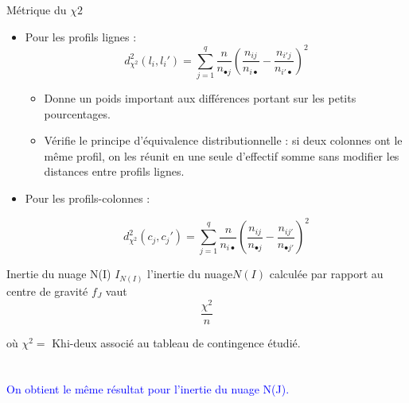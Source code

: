 \documentclass[10pt]{beamer}
\begin{document}
\begin{frame}{Métrique du $\chi 2$}

\begin{itemize}
\item Pour les profils lignes :\\

$$d^2_{\chi^2}(l_i,l_i')=\sum_{j=1}^{q}\frac{n}{n_{\bullet j}}(\frac{n_{ij}}{n_{i \bullet}}-\frac{n_{i'j}}{n_{i' \bullet}})^2  $$

\begin{itemize}
\item Donne un poids important aux différences portant sur les
petits pourcentages.
\item  Vérifie le principe d’équivalence distributionnelle : si deux
colonnes ont le même profil, on les réunit en une seule
d’effectif somme sans modifier les distances entre profils lignes.
\end{itemize}

\item Pour les profils-colonnes :

$$d^2_{\chi^2}(c_j,c_j')=\sum_{j=1}^{q}\frac{n}{n_{i \bullet }}(\frac{n_{ij}}{n_{\bullet j}}-\frac{n_{ij'}}{n_{ \bullet j'}})^2  $$       
       
\end{itemize}
\end{frame}
\begin{frame}{Inertie du nuage N(I)}
$I_{N(I)}$  l’inertie du nuage$ N(I)$ calculée par rapport
au centre de gravité $f_J$ vaut $$\frac{\chi^2}{n}$$

où $\chi^2=$ Khi-deux associé au tableau de contingence étudié.\\~\\~\\

\textcolor{blue}{On obtient le même résultat pour l’inertie du nuage N(J).}

\end{frame}
\end{document}
